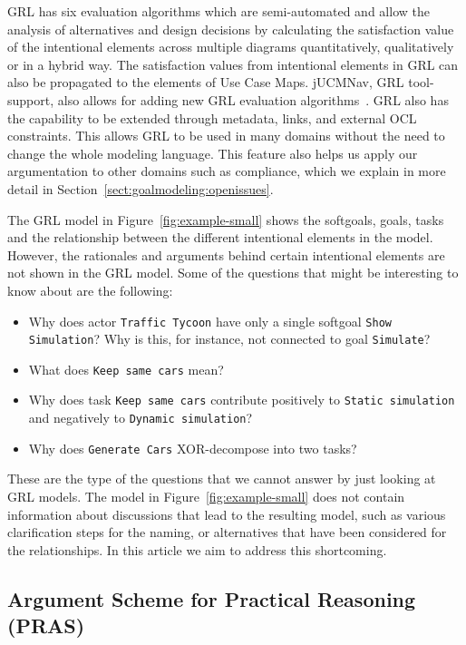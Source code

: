 GRL has six evaluation algorithms which are semi-automated and allow the analysis of alternatives and design decisions by calculating the satisfaction value of the intentional elements across multiple diagrams quantitatively, qualitatively or in a hybrid way. The satisfaction values from intentional elements in GRL can also be propagated to the elements of Use Case Maps.  jUCMNav, GRL tool-support, also allows for adding new GRL evaluation algorithms~\cite{jUCMNav}. GRL also has the capability to be extended through metadata, links, and external OCL constraints. This allows GRL to be used in many domains without the need to change the whole modeling language. This feature also helps us apply our argumentation to other domains such as compliance, which we explain in more detail in Section~\ref{sect:goalmodeling:openissues}.

The GRL model in Figure~\ref{fig:example-small} shows the softgoals, goals, tasks and the relationship between the different intentional elements in the model. However, the rationales and arguments behind certain intentional elements are not shown in the GRL model. Some of the questions that might be interesting to know about are the following:

\begin{itemize}
	\item Why does actor \texttt{Traffic Tycoon} have only a single softgoal \texttt{Show Simulation}? Why is this, for instance, not connected to goal \texttt{Simulate}? %
	\item What does \texttt{Keep same cars} mean?
	\item Why does task \texttt{Keep same cars} contribute positively to \texttt{Static simulation} and negatively to \texttt{Dynamic simulation}?
	\item Why does \texttt{Generate Cars} XOR-decompose into two tasks?
\end{itemize}

These are the type of the questions that we cannot answer by just looking at GRL models. The model in Figure~\ref{fig:example-small} does not contain information about discussions that lead to the resulting model, such as various clarification steps for the naming, or alternatives that have been considered for the relationships. In this article we aim to address this shortcoming.

\subsection{Argument Scheme for Practical Reasoning (PRAS)}
\label{sect:background:pras}

